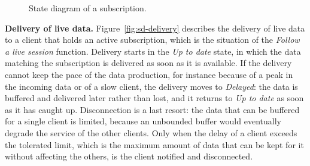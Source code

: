 \documentclass[11pt,a4paper]{article}
\begin{document}
\begin{figure}[H]
\centering
{}
\caption{State diagram of a subscription.}\label{fig:sd-sub}
\end{figure}

\textbf{Delivery of live data.} Figure~\ref{fig:sd-delivery} describes the delivery of live data to a client that
holds an active subscription, which is the situation of the \emph{Follow a live session} function. Delivery
starts in the \emph{Up to date} state, in which the data matching the subscription is delivered as soon as it is
available. If the delivery cannot keep the pace of the data production, for instance because of a peak in the
incoming data or of a slow client, the delivery moves to \emph{Delayed}: the data is buffered and delivered later
rather than lost, and it returns to \emph{Up to date} as soon as it has caught up. Disconnection is a last resort: the
data that can be buffered for a single client is limited, because an unbounded buffer would eventually degrade the
service of the other clients. Only when the delay of a client exceeds the tolerated limit, which is the maximum
amount of data that can be kept for it without affecting the others, is the client notified and disconnected.
\end{document}
